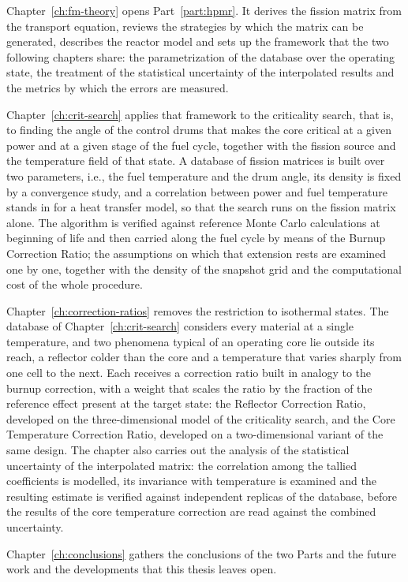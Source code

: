 Chapter~\ref{ch:fm-theory} opens Part~\ref{part:hpmr}. It derives the fission
matrix from the transport equation, reviews the strategies by which the matrix
can be generated, describes the reactor model and sets up the framework that the
two following chapters share: the parametrization of the database over the
operating state, the treatment of the statistical uncertainty of the
interpolated results and the metrics by which the errors are measured.

Chapter~\ref{ch:crit-search} applies that framework to the criticality search, that
is, to finding the angle of the control drums that makes the core critical at a
given power and at a given stage of the fuel cycle, together with the fission
source and the temperature field of that state. A database of fission
matrices is built over two parameters, i.e., the fuel temperature and the drum
angle, its density is fixed by a convergence study, and a correlation between
power and fuel temperature stands in for a heat transfer model, so that the search runs on the
fission matrix alone. The algorithm is verified against reference Monte Carlo
calculations at beginning of life and then carried along the fuel cycle by
means of the Burnup Correction Ratio; the assumptions on which that extension
rests are examined one by one, together with the density of the snapshot grid
and the computational cost of the whole procedure.

Chapter~\ref{ch:correction-ratios} removes the restriction to isothermal
states. The database of Chapter~\ref{ch:crit-search} considers every material at a
single temperature, and two phenomena typical of an operating core lie outside
its reach, a
reflector colder than the core and a temperature that varies sharply from one
cell to the next. Each receives a correction ratio built in analogy to the
burnup correction, with a weight that scales the ratio by the fraction of the
reference effect present at the target state: the Reflector Correction Ratio,
developed on the three-dimensional model of the criticality search, and the
Core Temperature Correction Ratio, developed on a two-dimensional variant of
the same design. The chapter also carries out the analysis of the statistical
uncertainty of the interpolated matrix:
the correlation among the tallied coefficients is modelled, its invariance with
temperature is examined and the resulting estimate is verified against
independent replicas of the database, before the results of the core
temperature correction are read against the combined uncertainty.

Chapter~\ref{ch:conclusions} gathers the conclusions of the two Parts and the
future work and the developments that this thesis leaves open.
